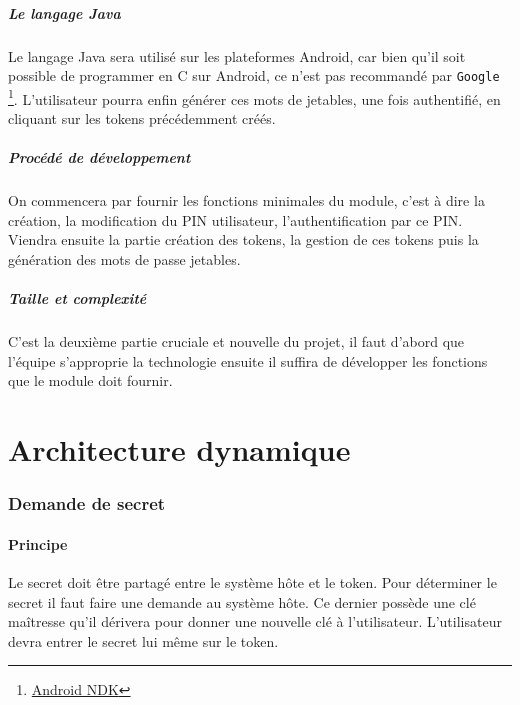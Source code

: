 \documentclass{"../../res/univ-projet"}
\begin{document}
\subsubsection{Le langage Java}
    Le langage Java sera utilisé sur les plateformes Android, car bien qu'il soit possible de programmer en C
    sur Android, ce n'est pas recommandé par \verb?Google?
    \footnote{\href{https://developer.android.com/tools/sdk/ndk/index.html}{Android NDK}}.
L’utilisateur pourra enfin générer ces mots de jetables, une fois authentifié, en cliquant sur les tokens précédemment créés.
	\subsubsection{Procédé de développement}
        On commencera par fournir les fonctions minimales du module, c'est à dire la création, la modification  du PIN utilisateur, l'authentification par ce PIN. Viendra ensuite la partie création des tokens, la gestion de ces tokens puis la génération des mots de passe  jetables.
        \subsubsection{Taille et complexité}
        C'est la deuxième partie cruciale et nouvelle du projet, il faut d'abord que l'équipe s'approprie la technologie ensuite il suffira de développer les fonctions que le module doit fournir.
\part*{Architecture dynamique}

\section{Demande de secret}
\subsection{Principe}
Le secret doit être partagé entre le système hôte et le token. Pour déterminer
le secret il faut faire une demande au système hôte. Ce dernier possède une clé
maîtresse qu'il dérivera pour donner une nouvelle clé à l'utilisateur. L'utilisateur
devra entrer le secret lui même sur le token.
\end{document}

